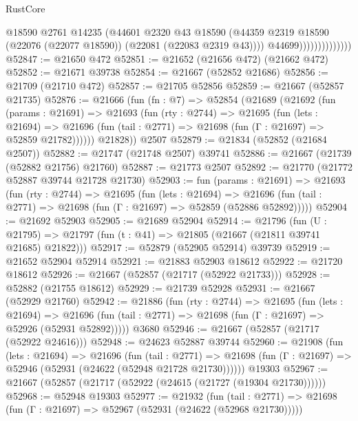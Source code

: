 \begin{lexlean}{RustCore}
\begin{coremodule}
                                @18590
                                @2761
                                @14235
                                (@44601
                                  @2320
                                  @43
                                  @18590
                                  (@44359
                                    @2319
                                    @18590
                                    (@22076 (@22077 @18590))
                                    (@22081 (@22083 @2319 @43))))
                                @44699))))))))))))))
@52847 := @21650 @472
@52851 := @21652 (@21656 @472) (@21662 @472)
@52852 := @21671 @39738
@52854 := @21667 (@52852 @21686)
@52856 := @21709 (@21710 @472)
@52857 := @21705 @52856
@52859 := @21667 (@52857 @21735)
@52876 := @21666
    (fun (fn : @7) =>
    @52854
      (@21689
        (@21692
          (fun (params : @21691) =>
          @21693
            (fun (rty : @2744) =>
            @21695
              (fun (lets : @21694) =>
              @21696 (fun (tail : @2771) => @21698 (fun (Γ : @21697) => @52859 @21782))))))
        @21828))
    @2507
@52879 := @21834 (@52852 (@21684 @2507))
@52882 := @21747 (@21748 @2507) @39741
@52886 := @21667 (@21739 (@52882 @21756) @21760)
@52887 := @21773 @2507
@52892 := @21770 (@21772 @52887 @39744 @21728 @21730)
@52903 := fun (params : @21691) =>
  @21693
    (fun (rty : @2744) =>
    @21695
      (fun (lets : @21694) =>
      @21696 (fun (tail : @2771) => @21698 (fun (Γ : @21697) => @52859 (@52886 @52892)))))
@52904 := @21692 @52903
@52905 := @21689 @52904
@52914 := @21796
    (fun (U : @21795) => @21797 (fun (t : @41) => @21805 (@21667 (@21811 @39741 @21685) @21822)))
@52917 := @52879 (@52905 @52914) @39739
@52919 := @21652 @52904 @52914
@52921 := @21883 @52903 @18612
@52922 := @21720 @18612
@52926 := @21667 (@52857 (@21717 (@52922 @21733)))
@52928 := @52882 (@21755 @18612)
@52929 := @21739 @52928
@52931 := @21667 (@52929 @21760)
@52942 := @21886
    (fun (rty : @2744) =>
    @21695
      (fun (lets : @21694) =>
      @21696 (fun (tail : @2771) => @21698 (fun (Γ : @21697) => @52926 (@52931 @52892)))))
    @3680
@52946 := @21667 (@52857 (@21717 (@52922 @24616)))
@52948 := @24623 @52887 @39744
@52960 := @21908
    (fun (lets : @21694) =>
    @21696
      (fun (tail : @2771) =>
      @21698 (fun (Γ : @21697) => @52946 (@52931 (@24622 (@52948 @21728 @21730))))))
    @19303
@52967 := @21667 (@52857 (@21717 (@52922 (@24615 (@21727 (@19304 @21730))))))
@52968 := @52948 @19303
@52977 := @21932
    (fun (tail : @2771) => @21698 (fun (Γ : @21697) => @52967 (@52931 (@24622 (@52968 @21730)))))

\end{coremodule}
\end{lexlean}
